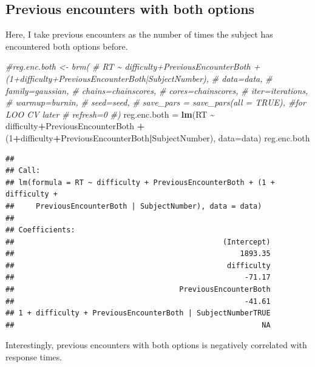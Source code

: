 \documentclass[
]{book}
\newenvironment{Shaded}{\begin{snugshade}}{\end{snugshade}}
\newcommand{\AttributeTok}[1]{\textcolor[rgb]{0.13,0.29,0.53}{#1}}
\newcommand{\CommentTok}[1]{\textcolor[rgb]{0.56,0.35,0.01}{\textit{#1}}}
\newcommand{\DecValTok}[1]{\textcolor[rgb]{0.00,0.00,0.81}{#1}}
\newcommand{\FunctionTok}[1]{\textcolor[rgb]{0.13,0.29,0.53}{\textbf{#1}}}
\newcommand{\NormalTok}[1]{#1}
\newcommand{\OtherTok}[1]{\textcolor[rgb]{0.56,0.35,0.01}{#1}}
\newcommand{\SpecialCharTok}[1]{\textcolor[rgb]{0.81,0.36,0.00}{\textbf{#1}}}
\begin{document}
\hypertarget{previous-encounters-with-both-options}{%
\subsection{Previous encounters with both options}\label{previous-encounters-with-both-options}}

Here, I take previous encounters as the number of times the subject has encountered both options before.

\begin{Shaded}
\begin{Highlighting}[]
\CommentTok{\#reg.enc.both \textless{}{-} brm(}
\CommentTok{\#  RT \textasciitilde{} difficulty+PreviousEncounterBoth + (1+difficulty+PreviousEncounterBoth|SubjectNumber),}
\CommentTok{\#  data=data,}
\CommentTok{\#  family=gaussian,}
\CommentTok{\#  chains=chainscores,}
\CommentTok{\#  cores=chainscores,}
\CommentTok{\#  iter=iterations,}
\CommentTok{\#  warmup=burnin,}
\CommentTok{\#  seed=seed,}
\CommentTok{\#  save\_pars = save\_pars(all = TRUE), \#for LOO CV later}
\CommentTok{\#  refresh=0}
\CommentTok{\#)}
\NormalTok{reg.enc.both }\OtherTok{=} \FunctionTok{lm}\NormalTok{(RT }\SpecialCharTok{\textasciitilde{}}\NormalTok{ difficulty}\SpecialCharTok{+}\NormalTok{PreviousEncounterBoth }\SpecialCharTok{+}\NormalTok{ (}\DecValTok{1}\SpecialCharTok{+}\NormalTok{difficulty}\SpecialCharTok{+}\NormalTok{PreviousEncounterBoth}\SpecialCharTok{|}\NormalTok{SubjectNumber), }\AttributeTok{data=}\NormalTok{data)}
\NormalTok{reg.enc.both}
\end{Highlighting}
\end{Shaded}

\begin{verbatim}
## 
## Call:
## lm(formula = RT ~ difficulty + PreviousEncounterBoth + (1 + difficulty + 
##     PreviousEncounterBoth | SubjectNumber), data = data)
## 
## Coefficients:
##                                                (Intercept)  
##                                                    1893.35  
##                                                 difficulty  
##                                                     -71.17  
##                                      PreviousEncounterBoth  
##                                                     -41.61  
## 1 + difficulty + PreviousEncounterBoth | SubjectNumberTRUE  
##                                                         NA
\end{verbatim}

Interestingly, previous encounters with both options is negatively correlated with response times.
\end{document}
